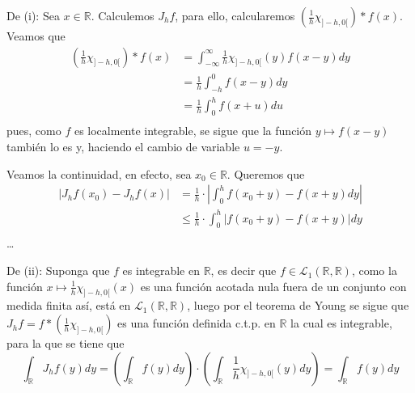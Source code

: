\documentclass[12pt]{report}
\newcounter{it}
\theoremstyle{largebreak}
\newcommand\abs[1]{\ensuremath{\left|#1\right|}}
\begin{document}
    \begin{sol}
        De (i): Sea $x\in\mathbb{R}$. Calculemos $J_hf$, para ello, calcularemos $\left(\frac{1}{h}\chi_{ ]-h,0[} \right)*f(x)$. Veamos que
        \begin{equation*}
            \begin{split}
                \left(\frac{1}{h}\chi_{ ]-h,0[} \right)*f(x)&=\int_{-\infty}^\infty\frac{1}{h}\chi_{ ]-h,0[}(y) f(x-y)dy\\
                &=\frac{1}{h}\int_{-h}^0f(x-y)dy\\
                &=\frac{1}{h}\int_{0}^hf(x+u)du\\
            \end{split}
        \end{equation*}
        pues, como $f$ es localmente integrable, se sigue que la función $y\mapsto f(x-y)$ también lo es y, haciendo el cambio de variable $u=-y$. 
        
        Veamos la continuidad, en efecto, sea $x_0\in\mathbb{R}$. Queremos que
        \begin{equation*}
            \begin{split}
                \abs{J_hf(x_0)-J_hf(x)}&=\frac{1}{h}\cdot\abs{\int_0^hf(x_0+y)-f(x+y)dy}\\
                &\leq\frac{1}{h}\cdot\int_0^h\abs{f(x_0+y)-f(x+y)}dy\\
            \end{split}
        \end{equation*}
        \dots

        De (ii): Suponga que $f$ es integrable en $\mathbb{R}$, es decir que $f\in\mathcal{L}_1(\mathbb{R},\mathbb{R})$, como la función $x\mapsto \frac{1}{h}\chi_{]-h,0[}(x)$ es una función acotada nula fuera de un conjunto con medida finita así, está en $\mathcal{L}_1(\mathbb{R},\mathbb{R})$, luego por el teorema de Young se sigue que $J_hf=f*\left(\frac{1}{h}\chi_{]-h,0[}\right)$ es una función definida c.t.p. en $\mathbb{R}$ la cual es integrable, para la que se tiene que
        \begin{equation*}
            \int_\mathbb{R} J_hf(y)dy=\left(\int_\mathbb{R}f(y)dy \right)\cdot\left(\int_\mathbb{R}\frac{1}{h}\chi_{]-h,0[}(y)dy \right)=\int_\mathbb{R}f(y)dy
        \end{equation*}


\end{sol}
\end{document}
